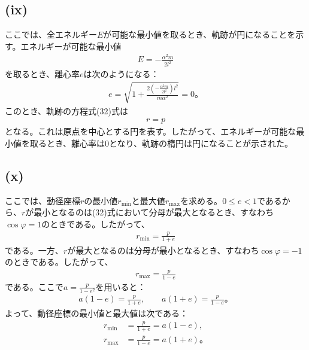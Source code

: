   \subsection*{(ix)}
  ここでは、全エネルギー$E$が可能な最小値を取るとき、軌跡が円になることを示す。エネルギーが可能な最小値
  \begin{align*}
    E=-\frac{\alpha^2m}{2l^2}
  \end{align*}
  を取るとき、離心率$e$は次のようになる：
  \begin{align*}
    e=\sqrt{1+\frac{2\left(-\frac{\alpha^2m}{2l^2}\right)l^2}{m\alpha^2}}=0。
  \end{align*}
  このとき、軌跡の方程式(32)式は
  \begin{align*}
    r=p
  \end{align*}
  となる。これは原点を中心とする円を表す。したがって、エネルギーが可能な最小値を取るとき、離心率は$0$となり、軌跡の楕円は円になることが示された。

  \subsection*{(x)}
  ここでは、動径座標$r$の最小値$r_{\min}$と最大値$r_{\max}$を求める。$0\leq e<1$であるから、$r$が最小となるのは(32)式において分母が最大となるとき、すなわち$\cos\varphi=1$のときである。したがって、
  \begin{align*}
    r_{\min}=\frac{p}{1+e}
  \end{align*}
  である。一方、$r$が最大となるのは分母が最小となるとき、すなわち$\cos\varphi=-1$のときである。したがって、
  \begin{align*}
    r_{\max}=\frac{p}{1-e}
  \end{align*}
  である。ここで$a=\frac{p}{1-e^2}$を用いると：
  \begin{align*}
    a(1-e)=\frac{p}{1+e},\qquad a(1+e)=\frac{p}{1-e}。
  \end{align*}
  よって、動径座標の最小値と最大値は次である：
  \begin{align*}
    r_{\min}&=\frac{p}{1+e}=a(1-e),\tag{37}\\
    r_{\max}&=\frac{p}{1-e}=a(1+e)。\tag{38}
  \end{align*}

